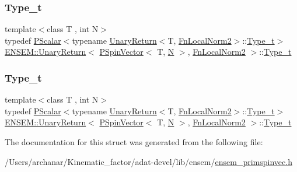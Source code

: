 \subsubsection{\texorpdfstring{Type\_t}{Type\_t}\hspace{0.1cm}{\footnotesize\ttfamily [2/3]}}
{\footnotesize\ttfamily template$<$class T , int N$>$ \\
typedef \mbox{\hyperlink{classENSEM_1_1PScalar}{P\+Scalar}}$<$typename \mbox{\hyperlink{structENSEM_1_1UnaryReturn}{Unary\+Return}}$<$T, \mbox{\hyperlink{structENSEM_1_1FnLocalNorm2}{Fn\+Local\+Norm2}}$>$\+::\mbox{\hyperlink{structENSEM_1_1UnaryReturn_3_01PSpinVector_3_01T_00_01N_01_4_00_01FnLocalNorm2_01_4_a0b0ee565a748d83ef4185e3d382d81de}{Type\+\_\+t}}$>$ \mbox{\hyperlink{structENSEM_1_1UnaryReturn}{E\+N\+S\+E\+M\+::\+Unary\+Return}}$<$ \mbox{\hyperlink{classENSEM_1_1PSpinVector}{P\+Spin\+Vector}}$<$ T, \mbox{\hyperlink{adat__devel_2lib_2hadron_2operator__name__util_8cc_a7722c8ecbb62d99aee7ce68b1752f337}{N}} $>$, \mbox{\hyperlink{structENSEM_1_1FnLocalNorm2}{Fn\+Local\+Norm2}} $>$\+::\mbox{\hyperlink{structENSEM_1_1UnaryReturn_3_01PSpinVector_3_01T_00_01N_01_4_00_01FnLocalNorm2_01_4_a0b0ee565a748d83ef4185e3d382d81de}{Type\+\_\+t}}}

\mbox{\label{structENSEM_1_1UnaryReturn_3_01PSpinVector_3_01T_00_01N_01_4_00_01FnLocalNorm2_01_4_a0b0ee565a748d83ef4185e3d382d81de}} 
\subsubsection{\texorpdfstring{Type\_t}{Type\_t}\hspace{0.1cm}{\footnotesize\ttfamily [3/3]}}
{\footnotesize\ttfamily template$<$class T , int N$>$ \\
typedef \mbox{\hyperlink{classENSEM_1_1PScalar}{P\+Scalar}}$<$typename \mbox{\hyperlink{structENSEM_1_1UnaryReturn}{Unary\+Return}}$<$T, \mbox{\hyperlink{structENSEM_1_1FnLocalNorm2}{Fn\+Local\+Norm2}}$>$\+::\mbox{\hyperlink{structENSEM_1_1UnaryReturn_3_01PSpinVector_3_01T_00_01N_01_4_00_01FnLocalNorm2_01_4_a0b0ee565a748d83ef4185e3d382d81de}{Type\+\_\+t}}$>$ \mbox{\hyperlink{structENSEM_1_1UnaryReturn}{E\+N\+S\+E\+M\+::\+Unary\+Return}}$<$ \mbox{\hyperlink{classENSEM_1_1PSpinVector}{P\+Spin\+Vector}}$<$ T, \mbox{\hyperlink{adat__devel_2lib_2hadron_2operator__name__util_8cc_a7722c8ecbb62d99aee7ce68b1752f337}{N}} $>$, \mbox{\hyperlink{structENSEM_1_1FnLocalNorm2}{Fn\+Local\+Norm2}} $>$\+::\mbox{\hyperlink{structENSEM_1_1UnaryReturn_3_01PSpinVector_3_01T_00_01N_01_4_00_01FnLocalNorm2_01_4_a0b0ee565a748d83ef4185e3d382d81de}{Type\+\_\+t}}}



The documentation for this struct was generated from the following file\+:\begin{DoxyCompactItemize}
\item 
/\+Users/archanar/\+Kinematic\+\_\+factor/adat-\/devel/lib/ensem/\mbox{\hyperlink{adat-devel_2lib_2ensem_2ensem__primspinvec_8h}{ensem\+\_\+primspinvec.\+h}}\end{DoxyCompactItemize}
